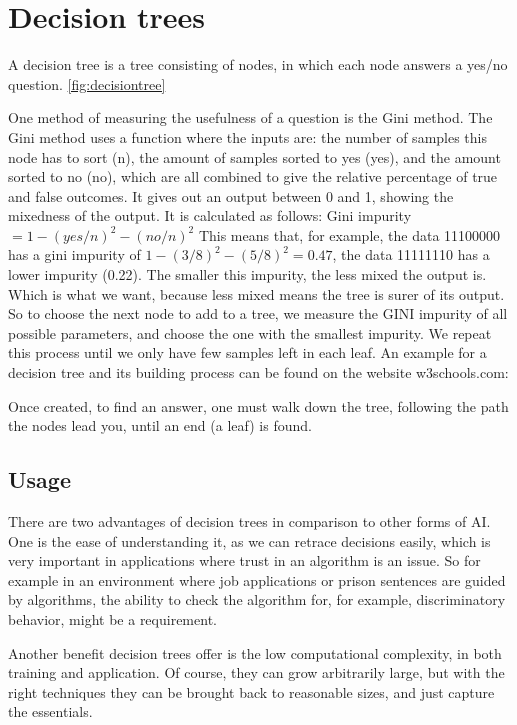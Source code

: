 \section{Decision trees}
\label{sec:decisionTrees}
\cite[p. 697]{MA}
A decision tree is a tree consisting of nodes, in which each node answers a yes/no question. \autoref{fig:decisiontree}

One method of measuring the usefulness of a question is the Gini method.
The Gini method uses a function where the inputs are: the number of samples this node has to sort (n), the amount of samples sorted to yes (yes), and the amount sorted to no (no), which are all combined to give the relative percentage of true and false outcomes. It gives out an output between 0 and 1, showing the mixedness of the output.
It is calculated as follows: Gini impurity $= 1-(yes/n)^2-(no/n)^2$ 
This means that, for example, the data 11100000 has a gini impurity of $1-(3/8)^2-(5/8)^2=0.47$, the data 11111110 has a lower impurity (0.22).
The smaller this impurity, the less mixed the output is. Which is what we want, because less mixed means the tree is surer of its output. 
So to choose the next node to add to a tree, we measure the GINI impurity of all possible parameters, and choose the one with the smallest impurity. We repeat this process until we only have few samples left in each leaf. 
An example for a decision tree and its building process can be found on the website w3schools.com:
\cite{decisiontree}

Once created, to find an answer, one must walk down the tree, following the path the nodes lead you, until an end (a leaf) is found.

\subsection{Usage}
There are two advantages of decision trees in comparison to other forms of AI. One is the ease of understanding it, as we can retrace decisions easily, which is very important in applications where trust in an algorithm is an issue. So for example in an environment where job applications or prison sentences are guided by algorithms, the ability to check the algorithm for, for example, discriminatory behavior, might be a requirement.

Another benefit decision trees offer is the low computational complexity, in both training and application. Of course, they can grow arbitrarily large, but with the right techniques they can be brought back to reasonable sizes, and just capture the essentials.

